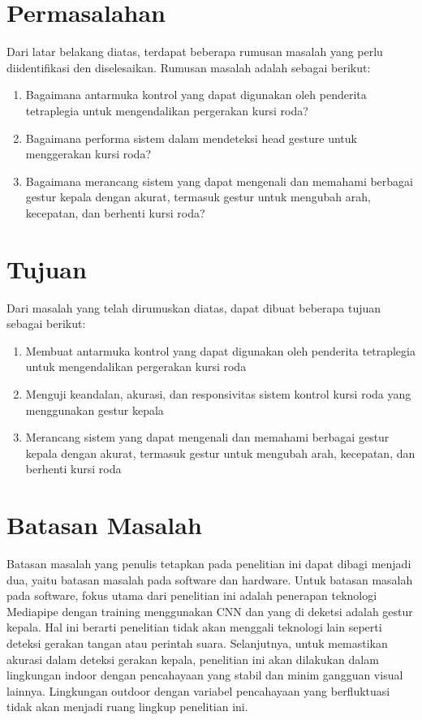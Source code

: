 \section{Permasalahan}
\label{sec:permasalahan}
Dari latar belakang diatas, terdapat beberapa rumusan masalah yang perlu diidentifikasi den diselesaikan. Rumusan masalah adalah sebagai berikut: 
\begin{enumerate}
    \item Bagaimana antarmuka kontrol yang dapat digunakan oleh penderita tetraplegia untuk mengendalikan pergerakan kursi roda?
    \item Bagaimana performa sistem dalam mendeteksi head gesture untuk menggerakan kursi roda?
    \item Bagaimana merancang sistem yang dapat mengenali dan memahami berbagai gestur kepala dengan akurat, termasuk gestur untuk mengubah arah, kecepatan, dan berhenti kursi roda? 
\end{enumerate}
 

\section{Tujuan}
\label{sec:Tujuan}
Dari masalah yang telah dirumuskan diatas, dapat dibuat beberapa tujuan sebagai berikut:
\begin{enumerate}
    \item Membuat antarmuka kontrol yang dapat digunakan oleh penderita tetraplegia untuk mengendalikan pergerakan kursi roda
    \item Menguji keandalan, akurasi, dan responsivitas sistem kontrol kursi roda yang menggunakan gestur kepala
    \item Merancang sistem yang dapat mengenali dan memahami berbagai gestur kepala dengan akurat, termasuk gestur untuk mengubah arah, kecepatan, dan berhenti kursi roda
\end{enumerate}


\section{Batasan Masalah}
\label{sec:batasanmasalah}
Batasan masalah yang penulis tetapkan pada penelitian ini dapat dibagi menjadi dua, yaitu batasan masalah pada software dan hardware. Untuk batasan masalah pada software, fokus utama dari penelitian ini adalah penerapan teknologi Mediapipe dengan training menggunakan CNN dan yang di deketsi adalah gestur kepala. Hal ini berarti penelitian tidak akan menggali teknologi lain seperti deteksi gerakan tangan atau perintah suara. Selanjutnya, untuk memastikan akurasi dalam deteksi gerakan kepala, penelitian ini akan dilakukan dalam lingkungan indoor dengan pencahayaan yang stabil dan minim gangguan visual lainnya. Lingkungan outdoor dengan variabel pencahayaan yang berfluktuasi tidak akan menjadi ruang lingkup penelitian ini.

